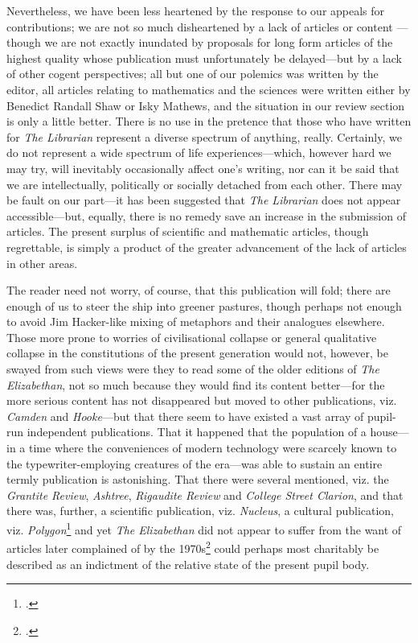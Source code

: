 Nevertheless, we have been less heartened by the response to our appeals for
contributions; we are not so much disheartened by a lack of articles or content
---though we are not exactly inundated by proposals for long form articles of
the highest quality whose publication must unfortunately be delayed---but by a
lack of other cogent perspectives; all but one of our polemics was written
by the editor, all articles relating to mathematics and the sciences were
written either by Benedict Randall Shaw or Isky Mathews, and the situation in
our review section is only a little better. There is no use in the pretence that
those who have written for \textit{The Librarian} represent a diverse spectrum
of anything, really. Certainly, we do not represent a wide spectrum of
life experiences---which, however hard we may try, will inevitably occasionally
affect one's writing, nor can it be said that we are intellectually, politically
or socially detached from each other. There may be fault on our part---it has
been suggested that \textit{The Librarian} does not appear accessible---but,
equally, there is no remedy save an increase in the
submission of articles. The present surplus of scientific and mathematic
articles, though regrettable, is simply a product of the greater advancement of
the lack of articles in other areas.

The reader need not worry, of course, that this publication will fold; there
are enough of us to steer the ship into greener pastures, though perhaps not
enough to avoid Jim Hacker-like mixing of metaphors and their analogues elsewhere.
Those more prone to worries of civilisational collapse or general qualitative
collapse in the constitutions of the present generation would not, however, be
swayed from such views were they to read some of the older editions of
\textit{The Elizabethan}, not so much because they would find its content
better---for the more serious content has not disappeared but moved to other
publications, viz. \textit{Camden} and \textit{Hooke}---but that there seem to
have existed a vast array of pupil-run independent publications. That it
happened that the population of a house---in a time where the conveniences
of modern technology were scarcely known to the typewriter-employing creatures
of the era---was able to sustain an entire termly publication is astonishing.
That there were several mentioned, viz. the \textit{Grantite Review},
\textit{Ashtree}, \textit{Rigaudite Review} and \textit{College Street
	Clarion}, and that there was, further, a scientific publication, viz.
\textit{Nucleus}, a cultural publication, viz.
\textit{Polygon}\footcite{magazines} and yet \textit{The Elizabethan} did not
appear to suffer from the want of articles later complained of by the
1970s\footcite{elizabethan76} could perhaps most charitably be described as an
indictment of the relative state of the present pupil body.

